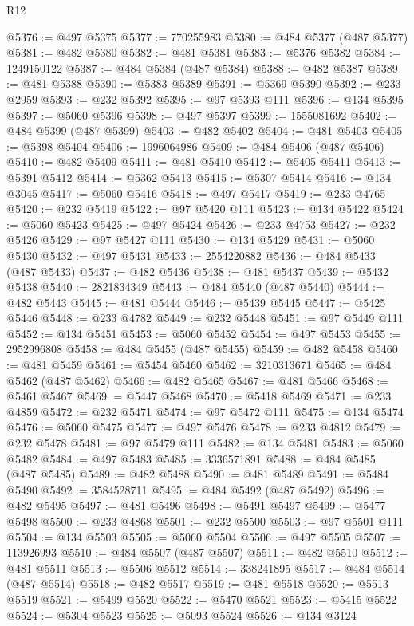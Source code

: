 \begin{lexlean}{R12}
\begin{coremodule}
{{{{{{{{{{{{{{{{{{{{{{{{{{{{{{{{{{{{{{{{{{{{{{{{{{{{{{{{{{{{{{{{{{{{{{{{{{{{{{{{{{@5376 := @497 @5375
@5377 := 770255983
@5380 := @484 @5377 (@487 @5377)
@5381 := @482 @5380
@5382 := @481 @5381
@5383 := @5376 @5382
@5384 := 1249150122
@5387 := @484 @5384 (@487 @5384)
@5388 := @482 @5387
@5389 := @481 @5388
@5390 := @5383 @5389
@5391 := @5369 @5390
@5392 := @233 @2959
@5393 := @232 @5392
@5395 := @97 @5393 @111
@5396 := @134 @5395
@5397 := @5060 @5396
@5398 := @497 @5397
@5399 := 1555081692
@5402 := @484 @5399 (@487 @5399)
@5403 := @482 @5402
@5404 := @481 @5403
@5405 := @5398 @5404
@5406 := 1996064986
@5409 := @484 @5406 (@487 @5406)
@5410 := @482 @5409
@5411 := @481 @5410
@5412 := @5405 @5411
@5413 := @5391 @5412
@5414 := @5362 @5413
@5415 := @5307 @5414
@5416 := @134 @3045
@5417 := @5060 @5416
@5418 := @497 @5417
@5419 := @233 @4765
@5420 := @232 @5419
@5422 := @97 @5420 @111
@5423 := @134 @5422
@5424 := @5060 @5423
@5425 := @497 @5424
@5426 := @233 @4753
@5427 := @232 @5426
@5429 := @97 @5427 @111
@5430 := @134 @5429
@5431 := @5060 @5430
@5432 := @497 @5431
@5433 := 2554220882
@5436 := @484 @5433 (@487 @5433)
@5437 := @482 @5436
@5438 := @481 @5437
@5439 := @5432 @5438
@5440 := 2821834349
@5443 := @484 @5440 (@487 @5440)
@5444 := @482 @5443
@5445 := @481 @5444
@5446 := @5439 @5445
@5447 := @5425 @5446
@5448 := @233 @4782
@5449 := @232 @5448
@5451 := @97 @5449 @111
@5452 := @134 @5451
@5453 := @5060 @5452
@5454 := @497 @5453
@5455 := 2952996808
@5458 := @484 @5455 (@487 @5455)
@5459 := @482 @5458
@5460 := @481 @5459
@5461 := @5454 @5460
@5462 := 3210313671
@5465 := @484 @5462 (@487 @5462)
@5466 := @482 @5465
@5467 := @481 @5466
@5468 := @5461 @5467
@5469 := @5447 @5468
@5470 := @5418 @5469
@5471 := @233 @4859
@5472 := @232 @5471
@5474 := @97 @5472 @111
@5475 := @134 @5474
@5476 := @5060 @5475
@5477 := @497 @5476
@5478 := @233 @4812
@5479 := @232 @5478
@5481 := @97 @5479 @111
@5482 := @134 @5481
@5483 := @5060 @5482
@5484 := @497 @5483
@5485 := 3336571891
@5488 := @484 @5485 (@487 @5485)
@5489 := @482 @5488
@5490 := @481 @5489
@5491 := @5484 @5490
@5492 := 3584528711
@5495 := @484 @5492 (@487 @5492)
@5496 := @482 @5495
@5497 := @481 @5496
@5498 := @5491 @5497
@5499 := @5477 @5498
@5500 := @233 @4868
@5501 := @232 @5500
@5503 := @97 @5501 @111
@5504 := @134 @5503
@5505 := @5060 @5504
@5506 := @497 @5505
@5507 := 113926993
@5510 := @484 @5507 (@487 @5507)
@5511 := @482 @5510
@5512 := @481 @5511
@5513 := @5506 @5512
@5514 := 338241895
@5517 := @484 @5514 (@487 @5514)
@5518 := @482 @5517
@5519 := @481 @5518
@5520 := @5513 @5519
@5521 := @5499 @5520
@5522 := @5470 @5521
@5523 := @5415 @5522
@5524 := @5304 @5523
@5525 := @5093 @5524
@5526 := @134 @3124
}}}}}}}}}}}}}}}}}}}}}}}}}}}}}}}}}}}}}}}}}}}}}}}}}}}}}}}}}}}}}}}}}}}}}}}}}}}}}}}}}}
\end{coremodule}
\end{lexlean}
